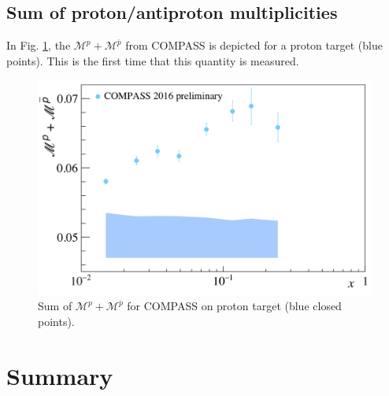 \subsection{Sum of proton/antiproton multiplicities}

In Fig. \ref{pic:psum}, the $\mathscr{M}^{p}+\mathscr{M}^{\bar{p}}$ from COMPASS is depicted for a proton target (blue points). This is the first time that this quantity is measured.

\begin{figure}[!h]
  \centering
	\includegraphics[scale=0.5]{./gfx/ps.png}
	\caption{Sum of $\mathscr{M}^{p}+\mathscr{M}^{\overline{p}}$ for COMPASS on proton target (blue closed points).}
	\label{pic:psum}
\end{figure}

\newpage

\section{Summary}

